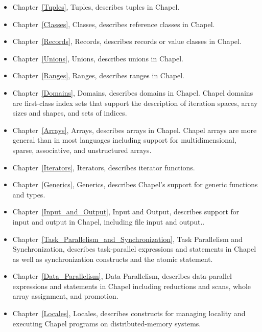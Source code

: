 \begin{itemize}
\item
Chapter~\ref{Tuples}, Tuples, describes tuples in Chapel.

\item
Chapter~\ref{Classes}, Classes, describes reference classes in Chapel.

\item
Chapter~\ref{Records}, Records, describes records or value classes in
Chapel.

\item
Chapter~\ref{Unions}, Unions, describes unions in Chapel.

\item
Chapter~\ref{Ranges}, Ranges, describes ranges in Chapel.

\item
Chapter~\ref{Domains}, Domains, describes domains in Chapel.  Chapel
domains are first-class index sets that support the description of
iteration spaces, array sizes and shapes, and sets of indices.

\item
Chapter~\ref{Arrays}, Arrays, describes arrays in Chapel.  Chapel arrays are
more general than in most languages including support for
multidimensional, sparse, associative, and unstructured arrays.

\item
Chapter~\ref{Iterators}, Iterators, describes iterator functions.

\item
Chapter~\ref{Generics}, Generics, describes Chapel's support for
generic functions and types.

\item
Chapter~\ref{Input_and_Output}, Input and Output, describes support
for input and output in Chapel, including file input and output..

\item
Chapter~\ref{Task_Parallelism_and_Synchronization}, Task Parallelism
and Synchronization, describes task-parallel expressions and
statements in Chapel as well as synchronization constructs and the atomic
statement.

\item
Chapter~\ref{Data_Parallelism}, Data Parallelism, describes
data-parallel expressions and statements in Chapel including
reductions and scans, whole array assignment, and promotion.

\item
Chapter~\ref{Locales}, Locales, describes constructs for managing
locality and executing Chapel programs on distributed-memory systems.


\end{itemize}
